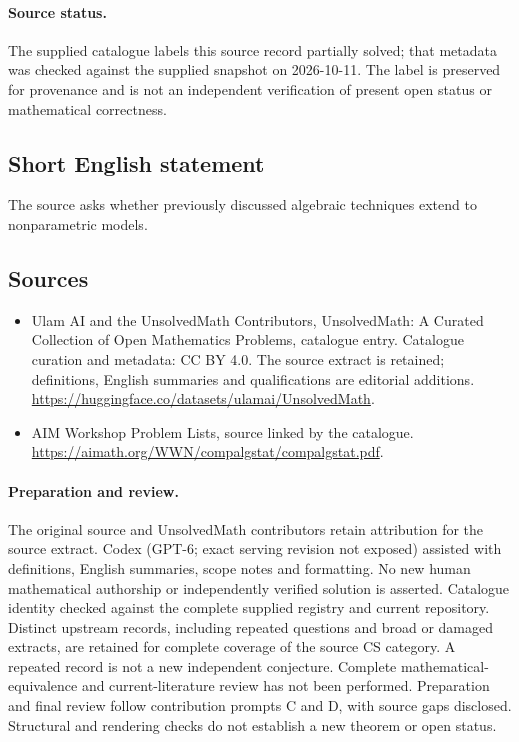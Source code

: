 \documentclass[11pt]{article}
\begin{document}
\paragraph{Source status.}
The supplied catalogue labels this source record partially solved; that metadata was checked against the supplied snapshot on 2026-10-11. The label is preserved for provenance and is not an independent verification of present open status or mathematical correctness.
\subsection{Short English statement}
The source asks whether previously discussed algebraic techniques extend to nonparametric models.
\subsection{Sources}
\begin{itemize}
\item[\hypertarget{source:statement:1}{S1}] Ulam AI and the UnsolvedMath Contributors, UnsolvedMath: A Curated Collection of Open Mathematics Problems, catalogue entry. Catalogue curation and metadata: CC BY 4.0. The source extract is retained; definitions, English summaries and qualifications are editorial additions.
\url{https://huggingface.co/datasets/ulamai/UnsolvedMath}.
\item[\hypertarget{source:statement:2}{S2}] AIM Workshop Problem Lists, source linked by the catalogue.
\url{https://aimath.org/WWN/compalgstat/compalgstat.pdf}.
\end{itemize}
\paragraph{Preparation and review.}
The original source and UnsolvedMath contributors retain attribution for the source extract. Codex (GPT-6; exact serving revision not exposed) assisted with definitions, English summaries, scope notes and formatting. No new human mathematical authorship or independently verified solution is asserted. Catalogue identity checked against the complete supplied registry and current repository. Distinct upstream records, including repeated questions and broad or damaged extracts, are retained for complete coverage of the source CS category. A repeated record is not a new independent conjecture. Complete mathematical-equivalence and current-literature review has not been performed. Preparation and final review follow contribution prompts C and D, with source gaps disclosed. Structural and rendering checks do not establish a new theorem or open status.
\label{end:statement}
\end{document}
